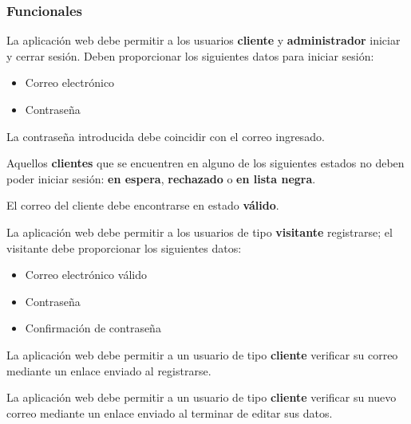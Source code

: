 %
%

\subsubsection{Funcionales}

{
  La aplicación web debe permitir a los usuarios \textbf{cliente} y
  \textbf{administrador} iniciar y cerrar sesión. Deben proporcionar los
  siguientes datos para iniciar sesión:
  \begin{itemize}
    \item Correo electrónico
    \item Contraseña
  \end{itemize}
}

{
  La contraseña introducida debe coincidir con el correo ingresado.
}

{
  Aquellos \textbf{clientes} que se encuentren en alguno de los siguientes
  estados no deben poder iniciar sesión: \textbf{en espera},
  \textbf{rechazado} o \textbf{en lista negra}.
}

{
  El correo del cliente debe encontrarse en estado \textbf{válido}.
}

{
  La aplicación web debe permitir a los usuarios  de tipo \textbf{visitante}
  registrarse; el visitante debe proporcionar los siguientes datos:
  \begin{itemize}
    \item Correo electrónico válido
    \item Contraseña
    \item Confirmación de contraseña
  \end{itemize}
}

{
  La aplicación web debe permitir a un usuario de tipo \textbf{cliente}
  verificar su correo mediante un enlace enviado al registrarse.
}

{
  La aplicación web debe permitir a un usuario de tipo \textbf{cliente}
  verificar su nuevo correo mediante un enlace enviado al terminar de editar
  sus datos.
}

